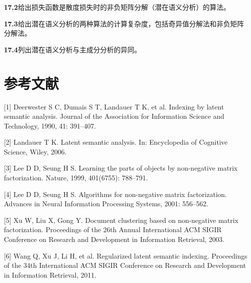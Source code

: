 \documentclass[UTF8, 12pt, fontset=fandol, oneside]{ctexart}
\begin{document}
\noindent\textbf{17.2}\quad 给出损失函数是散度损失时的非负矩阵分解（潜在语义分析）的算法。

\noindent\textbf{17.3}\quad 给出潜在语义分析的两种算法的计算复杂度，包括奇异值分解法和非负矩阵分解法。

\noindent\textbf{17.4}\quad 列出潜在语义分析与主成分分析的异同。

\section*{参考文献}

[1] Deerwester S C, Dumais S T, Landauer T K, et al. Indexing by latent semantic analysis. Journal of the Association for Information Science and Technology, 1990, 41: 391--407.

[2] Landauer T K. Latent semantic analysis. In: Encyclopedia of Cognitive Science, Wiley, 2006.

[3] Lee D D, Seung H S. Learning the parts of objects by non-negative matrix factorization. Nature, 1999, 401(6755): 788--791.

[4] Lee D D, Seung H S. Algorithms for non-negative matrix factorization. Advances in Neural Information Processing Systems, 2001: 556--562.

[5] Xu W, Liu X, Gong Y. Document clustering based on non-negative matrix factorization. Proceedings of the 26th Annual International ACM SIGIR Conference on Research and Development in Information Retrieval, 2003.

[6] Wang Q, Xu J, Li H, et al. Regularized latent semantic indexing. Proceedings of the 34th International ACM SIGIR Conference on Research and Development in Information Retrieval, 2011.
\end{document}
